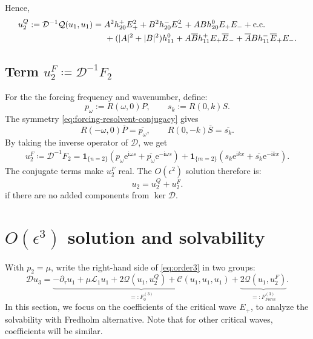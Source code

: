 \documentclass[11pt]{article}
\newcommand{\ii}{\mathrm{i}}
\newcommand{\ee}{\mathrm{e}}
\newcommand{\cQ}{\mathcal{Q}}
\newcommand{\cC}{\mathcal{C}}
\newcommand{\cL}{\mathcal{L}}
\newcommand{\cD}{\mathcal{D}}
\newcommand{\cc}{\mathrm{c.c.}}
\newcommand{\one}[1]{\bm{1}_{\{#1\}}}
\begin{document}
Hence,
\begin{align}
 u_2^{Q}:={}\cD^{-1}\cQ(u_1,u_1)
 &=A^2h_{20}^+E_+^2+B^2h_{20}^-E_-^2
 +ABh_{20}^0E_+E_-+\cc\notag\\
 &\hspace{0.5cm}+(|A|^2+|B|^2)h_{11}^0
 +A\overline B h_{11}^+E_+\overline E_-
 +\overline A B h_{11}^-\overline E_+E_-.
 \label{eq:u2Q}
\end{align}

\subsection{Term $u_2^F\coloneqq \cD^{-1}F_2$}
For the the forcing frequency and wavenumber, define:
\begin{equation}
\label{eq:forcing-responses}
 p_\omega:=R(\omega,0)P,
 \qquad
 s_k:=R(0,k)S.
\end{equation}
The symmetry \eqref{eq:forcing-resolvent-conjugacy} gives
\begin{equation}
 R(-\omega,0)\overline P=\overline{p_\omega},
 \qquad
 R(0,-k)\overline S=\overline{s_k}.
 \label{eq:forcing-response-conjugacy}
\end{equation}
By taking the inverse operator of $\cD$, we get
\begin{align}
 u_2^F\coloneqq \cD^{-1}F_2 =\one{n=2}\left(
 p_\omega\ee^{\ii\omega s}+\overline{p_\omega}\ee^{-\ii\omega s}\right)
 +\one{m=2}\left(
 s_k\ee^{\ii kx}+\overline{s_k}\ee^{-\ii kx}\right).
 \label{eq:u2F}
\end{align}
The conjugate terms make $u_2^F$ real. The  $O(\epsilon^2)$ solution therefore is:
\begin{equation}
 \boxed{u_2=u_2^Q+u_2^F.}
 \label{eq:u2-total}
\end{equation}
if there are no added components from $\ker\cD$.



\section{$O(\epsilon^3)$ solution and solvability}

With $p_2=\mu$, write the right-hand side of \eqref{eq:order3} in two 
groups:
\begin{equation}
\cD u_3
=
\underbrace{-\partial_\tau u_1+\mu\cL_1u_1
+2\cQ(u_1,u_2^Q)+\cC(u_1,u_1,u_1)}_{=:F_{0}^{(3)}}
+\underbrace{2\cQ(u_1,u_2^F)}_{=:F_{Force}^{(3)}}.
\end{equation}
In this section, we focus on the coefficients of the critical wave $E_+$, to analyze the solvability with Fredholm alternative. Note that for other critical waves, coefficients will be similar. 
\end{document}
